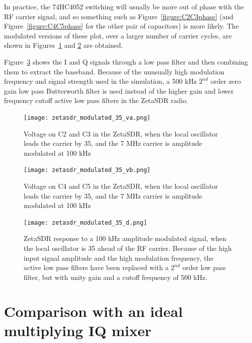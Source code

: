 \documentclass[11pt, twoside]{article}
\begin{document}
In practice, the 74HC4052 switching will usually be more out of phase
with the RF carrier signal, and so something such as
Figure~\ref{figure:C2C3phase} (and Figure~\ref{figure:C4C5phase} for
the other pair of capacitors) is more likely.  The modulated versions
of these plot, over a larger number of carrier cycles, are shown in
Figures~\ref{figure:C2C3modphase} and \ref{figure:C4C5modphase} are
obtained.

Figure~\ref{figure:zetasdr_low_pass_phase} shows the I and Q signals
through a low pass filter and then combining them to extract the
baseband.  Because of the unusually high modulation frequency and
signal strength used in the simulation, a 500 kHz $2^{nd}$ order zero
gain low pass Butterworth filter is used instead of the higher gain
and lower frequency cutoff active low pass filters in the ZetaSDR
radio.

\begin{figure}
  \center
  \captionsetup{width=.8\linewidth}
  \texttt{[image: zetasdr\_modulated\_35\_va.png]}
  \caption{Voltage on C2 and C3 in the ZetaSDR, when the local
    oscillator leads the carrier by 35{\degree}, and the 7 MHz carrier
    is amplitude modulated at 100 kHz}
  \label{figure:C2C3modphase}
\end{figure}

\begin{figure}
  \center
  \captionsetup{width=.8\linewidth}
  \texttt{[image: zetasdr\_modulated\_35\_vb.png]}
  \caption{Voltage on C4 and C5 in the ZetaSDR, when the local
    oscillator leads the carrier by 35{\degree}, and the 7 MHz carrier
    is amplitude modulated at 100 kHz}
  \label{figure:C4C5modphase}
\end{figure}


\begin{figure}
  \center
  \captionsetup{width=.8\linewidth}
  \texttt{[image: zetasdr\_modulated\_35\_d.png]}
  \caption{ZetaSDR response to a 100 kHz amplitude modulated signal,
    when the local oscillator is 35{\degree} ahead of the RF
    carrier. Because of the high input signal amplitude and the high
    modulation frequency, the active low pass filters have been
    replaced with a $2^{nd}$ order low pass filter, but with unity
    gain and a cutoff frequency of 500 kHz.}
  \label{figure:zetasdr_low_pass_phase}
\end{figure}

\section{Comparison with an ideal multiplying IQ mixer}
\end{document}
